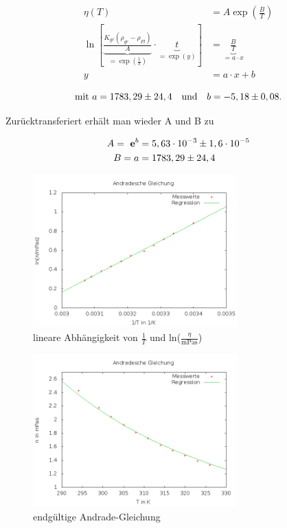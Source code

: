 \begin{align*}
 \eta(T) &= A \exp \left(\frac{B}{T}\right) \\
 \ln \left[ \underbrace{\frac{K_{gr}(\rho_{gr}-\rho_{Fl})}{A}}_{=\exp \left(\frac1b\right)} \cdot \underbrace{t}_{=\exp(y)}  \right] &= \underbrace{\frac{B}{T}}_{=a\cdot x}\\
 y &= a\cdot x + b
\end{align*}

\begin{equation}
\text{mit } a = 1783,29\pm 24,4 \quad \text{und} \quad b = -5,18 \pm 0,08.\\
\end{equation}

Zurücktransferiert erhält man wieder A und B zu

\begin{align}
 A = \ \mathbf{e}^b &= 5,63 \cdot 10^{-3} \pm 1,6 \cdot 10^{-5}\\
 B = a &= 1783,29 \pm 24,4
\end{align}

\begin{figure}[H]
\includegraphics[width=0.7\textwidth] {pics/Andrade.png}
\centering
\caption{lineare Abhängigkeit von $\frac1T$ und ln($\frac{\eta}{\text{mPas}}$)}
\end{figure}

\begin{figure}[H]
\includegraphics[width=0.7\textwidth] {pics/Viskos.png}
\centering
\caption{endgültige Andrade-Gleichung}
\end{figure}

